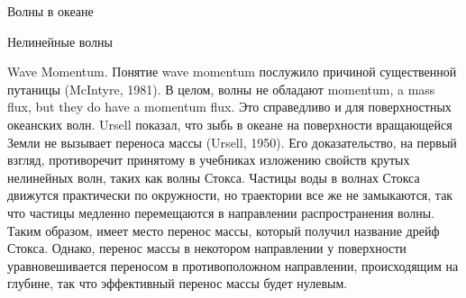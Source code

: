 \begin{chapter}{Волны в океане}
\begin{section}{Нелинейные волны}

\begin{paragraph}{Wave Momentum.}
Понятие wave momentum послужило причиной существенной
путаницы (McIntyre, 1981). В целом, волны не обладают 
momentum, a mass flux, but they do have a momentum flux. 
Это справедливо и для поверхностных океанских волн.
Ursell показал, что зыбь в океане на поверхности вращающейся 
Земли не вызывает переноса массы (Ursell, 1950).  
Его доказательство, на первый взгляд, противоречит принятому в учебниках
изложению свойств крутых нелинейных волн, таких как волны Стокса. Частицы
воды в волнах Стокса движутся практически по окружности, но траектории все
же не замыкаются, так что частицы медленно перемещаются в направлении
распространения волны. Таким образом, имеет место перенос массы, который
получил название дрейф Стокса. Однако, перенос массы в некотором направлении
у поверхности уравновешивается переносом в противоположном направлении,
происходящим на глубине, так что эффективный перенос массы будет нулевым.
%
\end{paragraph}
\end{section}


\end{chapter}

